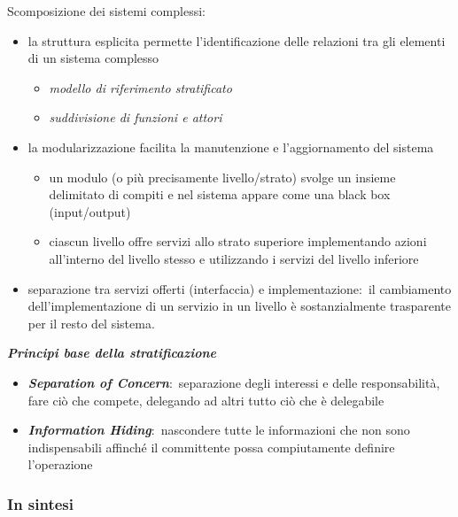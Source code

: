 Scomposizione dei sistemi complessi:\
\begin{itemize}
    \item la struttura esplicita permette l'identificazione delle relazioni tra gli elementi di un sistema complesso
          \begin{itemize}
              \item \emph{modello di riferimento stratificato}
              \item \emph{suddivisione di funzioni e attori}
          \end{itemize}
    \item la modularizzazione facilita la manutenzione e l'aggiornamento del sistema
          \begin{itemize}
              \item un modulo (o più precisamente livello/strato) svolge un insieme delimitato di compiti e nel sistema appare come una black box (input/output)
              \item ciascun livello offre servizi allo strato superiore implementando azioni all'interno del livello stesso e utilizzando i servizi del livello inferiore
          \end{itemize}
    \item separazione tra servizi offerti (interfaccia) e implementazione:\ il cambiamento dell'implementazione di un servizio in un livello è sostanzialmente trasparente per il resto del sistema.
\end{itemize}
\textbf{\emph{Principi base della stratificazione}}
\begin{itemize}
    \item \textbf{\emph{Separation of Concern}}:\ separazione degli interessi e delle responsabilità, fare ciò che compete, delegando ad altri tutto ciò che è delegabile
    \item \textbf{\emph{Information Hiding}}:\ nascondere tutte le informazioni che non sono indispensabili affinché il committente possa compiutamente definire l'operazione
\end{itemize}

\subsubsection{In sintesi}

